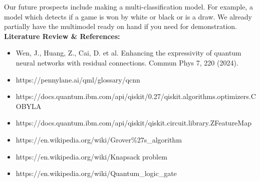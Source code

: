 \documentclass[a4paper]{article}
\begin{document}
Our future prospects include making a multi-classification model. For example, a model which detects if a game is won by white or black or is a draw. We already partially have the multimodel ready on hand if you need for demonstration.\\

\indent \textbf{Literature Review \& References: }
\begin{itemize}
\item Wen, J., Huang, Z., Cai, D. et al. Enhancing the expressivity of quantum neural networks with residual connections. Commun Phys 7, 220 (2024).
\item https://pennylane.ai/qml/glossary/qcnn
\item https://docs.quantum.ibm.com/api/qiskit/0.27/qiskit.algorithms.optimizers.COBYLA
\item https://docs.quantum.ibm.com/api/qiskit/qiskit.circuit.library.ZFeatureMap
\item https://en.wikipedia.org/wiki/Grover\%27s\_algorithm
\item https://en.wikipedia.org/wiki/Knapsack problem
\item https://en.wikipedia.org/wiki/Quantum\_logic\_gate

\end{itemize}
\end{document}
